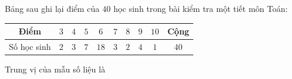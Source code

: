 \begin{ex}
Bảng sau ghi lại điểm của $40$ học sinh trong bài kiểm tra một tiết môn Toán:
\begin{center}
\begin{tabular}{|c|c|c|c|c|c|c|c|c|c|}\hline
Điểm & $3$ & $4$ & $5$ & $6$ & $7$ & $8$ & $9$ & $10$ & Cộng\\\hline
Số học sinh & $2$ & $3$ & $7$ & $18$ & $3$ & $2$ & $4$ & $1$ & $40$\\\hline
\end{tabular}
\end{center}
Trung vị của mẫu số liệu là
\end{ex}
